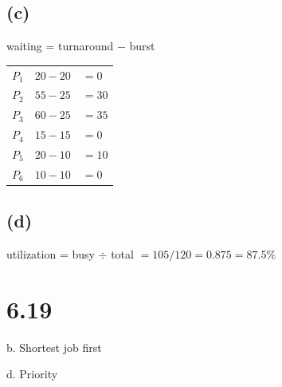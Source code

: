 \documentclass{article}
\begin{document}
\subsection*{(c)}
waiting = turnaround $-$ burst

\begin{tabular}{lcl}
  $P_1$ & $20 - 20$ & $= 0$ \\
  $P_2$ & $55 - 25$ & $= 30$ \\
  $P_3$ & $60 - 25$ & $= 35$ \\
  $P_4$ & $15 - 15$ & $= 0$ \\
  $P_5$ & $20 - 10$ & $= 10$ \\
  $P_6$ & $10 - 10$ & $= 0$ \\
\end{tabular}

\subsection*{(d)}
utilization = busy $\div$ total $= 105 / 120 = 0.875 = 87.5\%$

\section*{6.19}
b. Shortest job first

d. Priority
\end{document}
